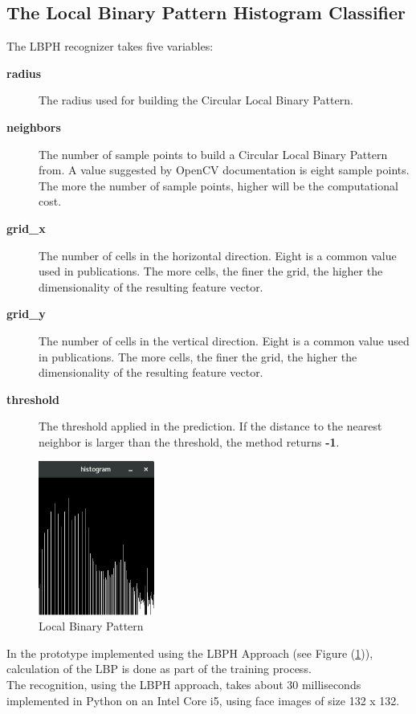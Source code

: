 \subsection{The Local Binary Pattern Histogram Classifier}
The LBPH recognizer takes five variables: \\
\begin{description}
  \item[\textbf{radius}] \quad
  The radius used for building the Circular Local Binary Pattern.

  \item[\textbf{neighbors}] \quad
  The number of sample points to build a Circular Local Binary Pattern from.
  A value suggested by OpenCV documentation is eight sample points.
  The more the number of sample points, higher will be the computational cost.

  \item[\textbf{grid\_x}] \quad
  The number of cells in the horizontal direction.
  Eight is a common value used in publications.
  The more cells, the finer the grid, the higher the dimensionality of the
  resulting feature vector.

  \item[\textbf{grid\_y}] \quad
  The number of cells in the vertical direction.
  Eight is a common value used in publications.
  The more cells, the finer the grid, the higher the dimensionality of the
  resulting feature vector.

  \item[\textbf{threshold}] \quad
  The threshold applied in the prediction.
  If the distance to the nearest neighbor is larger than the threshold,
  the method returns \textbf{-1}.
\end{description}

\begin{figure}[!t]
\centering
\includegraphics[width=1.5in]{./histogram.png}
\caption{Local Binary Pattern}
\label{fig:lbph}
\end{figure}

In the prototype implemented using the LBPH Approach (see Figure (\ref{fig:lbph})), calculation of the
LBP is done as part of the training process. \\
The recognition, using the LBPH approach, takes about 30 milliseconds
implemented in Python on an Intel Core i5, using face images of size 132 x 132. \\

